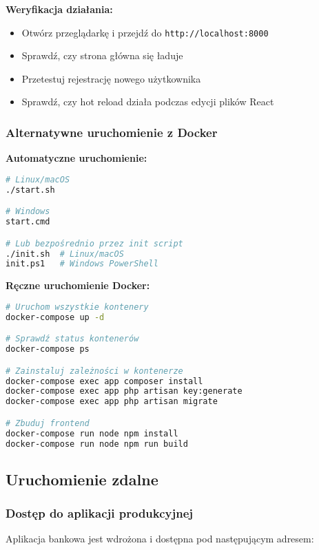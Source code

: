 \documentclass[12pt,a4paper]{article}
\begin{document}
    \textbf{Weryfikacja działania:}
    \begin{itemize}
        \item Otwórz przeglądarkę i przejdź do \texttt{http://localhost:8000}
        \item Sprawdź, czy strona główna się ładuje
        \item Przetestuj rejestrację nowego użytkownika
        \item Sprawdź, czy hot reload działa podczas edycji plików React
    \end{itemize}

    \subsubsection{Alternatywne uruchomienie z Docker}

    \textbf{Automatyczne uruchomienie:}
    \begin{lstlisting}[language=bash, caption=Uruchomienie z Docker]
# Linux/macOS
./start.sh

# Windows
start.cmd

# Lub bezpośrednio przez init script
./init.sh  # Linux/macOS
init.ps1   # Windows PowerShell
    \end{lstlisting}

    \textbf{Ręczne uruchomienie Docker:}
    \begin{lstlisting}[language=bash, caption=Docker Compose]
# Uruchom wszystkie kontenery
docker-compose up -d

# Sprawdź status kontenerów
docker-compose ps

# Zainstaluj zależności w kontenerze
docker-compose exec app composer install
docker-compose exec app php artisan key:generate
docker-compose exec app php artisan migrate

# Zbuduj frontend
docker-compose run node npm install
docker-compose run node npm run build
    \end{lstlisting}

    \subsection{Uruchomienie zdalne}

    \subsubsection{Dostęp do aplikacji produkcyjnej}

    Aplikacja bankowa jest wdrożona i dostępna pod następującym adresem:
\end{document}
